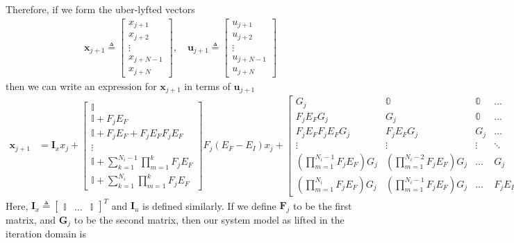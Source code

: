 \documentclass[landscape]{article}
\begin{document}
Therefore, if we form the uber-lyfted vectors
\begin{align}
\mathbf{x}_{j+1} \triangleq \begin{bmatrix} x_{j+1} \\ x_{j+2} \\ \vdots \\ x_{j+N-1} \\ x_{j+N}\end{bmatrix}, \quad 
\mathbf{u}_{j+1} \triangleq \begin{bmatrix} u_{j+1} \\ u_{j+2} \\ \vdots \\ u_{j+N-1} \\ u_{j+N}\end{bmatrix}
\end{align}
then we can write an expression for $\mathbf{x}_{j+1}$ in terms of $\mathbf{u}_{j+1}$
\begin{align}
\mathbf{x}_{j+1} 
& = \mathbf{I}_x x_j + \begin{bmatrix} \mathbb{I} \\ \mathbb{I} + F_j E_F \\ \mathbb{I} + F_j E_F + F_j E_F F_j E_F\\ \vdots \\ \mathbb{I} + \sum_{k = 1}^{N_i-1} \prod_{m=1}^{k}F_j E_F \\ \mathbb{I} + \sum_{k = 1}^{N_i} \prod_{m=1}^{k}F_j E_F \end{bmatrix} F_j \left(E_F - E_I\right)x_j
+\begin{bmatrix} 
G_j & \mathbb{0} & \mathbb{0} & \hdots & \mathbb{0} \\
F_j E_F G_j   & G_j & \mathbb{0} & \hdots & \mathbb{0} \\
F_j E_F F_j E_F G_j   & F_j E_F G_j & G_j & \hdots & \mathbb{0} \\
\vdots & \vdots & \vdots & \ddots & \vdots \\
\left(\prod_{m=1}^{N_i-1}F_j E_F\right)G_j & \left(\prod_{m=1}^{N_i-2}F_j E_F\right)G_j & \hdots & G_j & \mathbb{0} \\
\left(\prod_{m=1}^{N_i}F_j E_F\right)G_j & \left(\prod_{m=1}^{N_i-1}F_j E_F\right)G_j & \hdots & F_j E_F G_j & G_j
\end{bmatrix}
\left(\mathbf{u}_{j+1}- \mathbf{I}_u u_j \right)
\end{align}
Here, $\mathbf{I}_x\triangleq \begin{bmatrix} \mathbb{I} & \hdots & \mathbb{I} \end{bmatrix}^T$ and $\mathbf{I}_u$ is defined similarly.  If we define $\mathbf{F}_j$ to be the first matrix, and $\mathbf{G}_j$ to be the second matrix, then our system model as lifted in the iteration domain is
\end{document}
